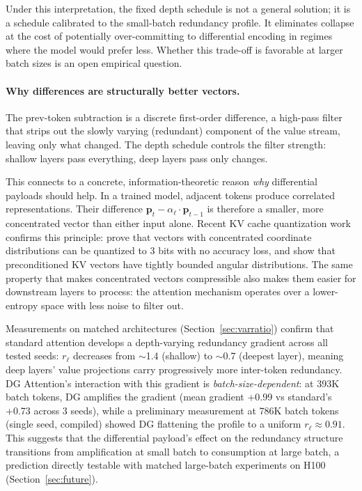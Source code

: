 \documentclass[11pt]{article}
\begin{document}
Under this interpretation, the fixed depth schedule is not a general solution; it is a schedule calibrated to the small-batch redundancy profile. It eliminates collapse at the cost of potentially over-committing to differential encoding in regimes where the model would prefer less. Whether this trade-off is favorable at larger batch sizes is an open empirical question.

\paragraph{Why differences are structurally better vectors.}
The prev-token subtraction is a discrete first-order difference, a high-pass filter that strips out the slowly varying (redundant) component of the value stream, leaving only what changed. The depth schedule controls the filter strength: shallow layers pass everything, deep layers pass only changes.

This connects to a concrete, information-theoretic reason \emph{why} differential payloads should help. In a trained model, adjacent tokens produce correlated representations. Their difference $\mathbf{p}_t - \alpha_\ell \cdot \mathbf{p}_{t-1}$ is therefore a smaller, more concentrated vector than either input alone. Recent KV cache quantization work confirms this principle: \citet{zandieh2025turboquant} prove that vectors with concentrated coordinate distributions can be quantized to 3 bits with no accuracy loss, and \citet{han2025polarquant} show that preconditioned KV vectors have tightly bounded angular distributions. The same property that makes concentrated vectors compressible also makes them easier for downstream layers to process: the attention mechanism operates over a lower-entropy space with less noise to filter out.

Measurements on matched architectures (Section~\ref{sec:varratio}) confirm that standard attention develops a depth-varying redundancy gradient across all tested seeds: $r_\ell$ decreases from $\sim$1.4 (shallow) to $\sim$0.7 (deepest layer), meaning deep layers' value projections carry progressively more inter-token redundancy. DG Attention's interaction with this gradient is \emph{batch-size-dependent}: at 393K batch tokens, DG amplifies the gradient (mean gradient +0.99 vs standard's +0.73 across 3 seeds), while a preliminary measurement at 786K batch tokens (single seed, compiled) showed DG flattening the profile to a uniform $r_\ell \approx 0.91$. This suggests that the differential payload's effect on the redundancy structure transitions from amplification at small batch to consumption at large batch, a prediction directly testable with matched large-batch experiments on H100 (Section~\ref{sec:future}).
\end{document}
